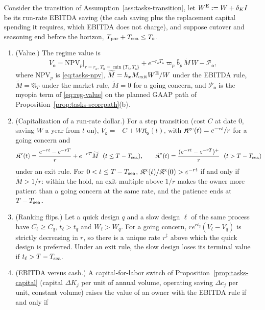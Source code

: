 \begin{proposition}\label{prop:reg-value}
Consider the transition of Assumption~\ref{ass:tasks-transition}, let $W^{\rm E}:=W+\delta_KI$ be its run-rate EBITDA saving (the cash saving plus the replacement capital spending it requires, which EBITDA does not charge), and suppose cutover and seasoning end before the horizon, $T_{\rm par}+T_{\rm sea}\le T_{\mathsf o}$.
\begin{enumerate}
\item[(a)] (Value.) The regime value is
\begin{equation}\label{eq:reg-trans}
V_{\mathsf o}=\mathrm{NPV}_p\big|_{r=r_{\mathsf o},\,T_h=\min\{T_h,T_{\mathsf o}\}}+e^{-r_{\mathsf o}T_{\mathsf o}}\varpi_p\bar b_p\,\widetilde M\,W-\mathcal P_{\mathsf o},
\end{equation}
where $\mathrm{NPV}_p$ is \eqref{eq:tasks-npv}, $\widetilde M=h_xM_{\rm exit}W^{\rm E}/W$ under the EBITDA rule, $\widetilde M=\mathfrak A_T$ under the market rule, $\widetilde M=0$ for a going concern, and $\mathcal P_{\mathsf o}$ is the myopia term of \eqref{eq:reg-value} on the planned GAAP path of Proposition~\ref{prop:tasks-scorepath}(b).
\item[(b)] (Capitalization of a run-rate dollar.) For a step transition (cost $C$ at date 0, saving $W$ a year from $t$ on), $V_{\mathsf o}=-C+W\mathfrak K_{\mathsf o}(t)$, with $\mathfrak K^{\rm gc}(t)=e^{-rt}/r$ for a going concern and
\begin{equation}\label{eq:reg-K}
\mathfrak K^{\rm x}(t)=\frac{e^{-rt}-e^{-rT}}{r}+e^{-rT}\widetilde M\ \ (t\le T-T_{\rm sea}),\qquad \mathfrak K^{\rm x}(t)=\frac{(e^{-rt}-e^{-rT})^+}{r}\ \ (t>T-T_{\rm sea})
\end{equation}
under an exit rule. For $0<t\le T-T_{\rm sea}$, $\mathfrak K^{\rm x}(t)/\mathfrak K^{\rm x}(0)>e^{-rt}$ if and only if $\widetilde M>1/r$: within the hold, an exit multiple above $1/r$ makes the owner more patient than a going concern at the same rate, and the patience ends at $T-T_{\rm sea}$.
\item[(c)] (Ranking flips.) Let a quick design $q$ and a slow design $\ell$ of the same process have $C_\ell\ge C_q$, $t_\ell>t_q$ and $W_\ell>W_q$. For a going concern, $re^{rt_q}(V_\ell-V_q)$ is strictly decreasing in $r$, so there is a unique rate $r^\ddagger$ above which the quick design is preferred. Under an exit rule, the slow design loses its terminal value if $t_\ell>T-T_{\rm sea}$.
\item[(d)] (EBITDA versus cash.) A capital-for-labor switch of Proposition~\ref{prop:tasks-capital} (capital $\Delta K_j$ per unit of annual volume, operating saving $\Delta c_j$ per unit, constant volume) raises the value of an owner with the EBITDA rule if and only if

\end{enumerate}
\end{proposition}
